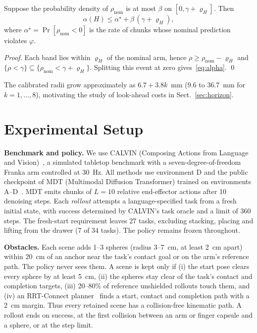 \documentclass[runningheads]{llncs}
\begin{document}
\begin{proposition}\label{prop:conservatism}
Suppose the probability density of $\rho_{\mathrm{nom}}$ is at most
$\beta$ on $[0,\gamma+\varrho_H]$. Then
\begin{equation}
\alpha(H) \le \alpha^\star + \beta\,(\gamma + \varrho_H),
\label{eq:alpha}
\end{equation}
where $\alpha^\star = \Pr[\rho_{\mathrm{nom}} < 0]$ is the rate of chunks
whose nominal prediction violates $\varphi$.
\end{proposition}
\begin{proof}
Each band lies within $\varrho_H$ of the nominal arm, hence
$\rho \ge \rho_{\mathrm{nom}} - \varrho_H$ and
$\{\rho < \gamma\} \subseteq \{\rho_{\mathrm{nom}} < \gamma + \varrho_H\}$.
Splitting this event at zero gives~\eqref{eq:alpha}. \qed
\end{proof}

The calibrated radii grow approximately as $6.7+3.8k$~mm (9.6 to 36.7~mm
for $k=1,\dots,8$), motivating the study of look-ahead costs in
Sect.~\ref{sec:horizon}.

\section{Experimental Setup}\label{sec:setup}

\textbf{Benchmark and policy.} We use CALVIN (Composing Actions from Language
and Vision)~\cite{mees2022calvin}, a simulated tabletop benchmark with a
seven-degree-of-freedom Franka arm controlled at 30~Hz.
All methods use environment D and the public checkpoint of MDT
(Multimodal Diffusion Transformer) trained on environments A--D~\cite{reuss2024mdt}. MDT
emits chunks of $L = 10$ relative end-effector actions after 10 denoising
steps. Each \emph{rollout} attempts a language-specified task from a fresh
initial state, with success determined by CALVIN's task oracle and a limit
of 360 steps. The fresh-start requirement leaves 27 tasks,
excluding stacking, placing and lifting from the drawer (7 of 34 tasks).
The policy remains frozen throughout.

\textbf{Obstacles.} Each scene adds 1--3 spheres (radius 3--7~cm, at least
2~cm apart) within 20~cm of an anchor near the task's contact goal or on the
arm's reference path. The policy never sees them. A scene
is kept only if (i) the start pose clears every sphere by at least 5~cm,
(ii) the spheres stay clear of the task's contact and completion targets,
(iii) 20--80\% of reference unshielded rollouts touch them, and (iv) an
RRT-Connect planner~\cite{kuffner2000rrt} finds a start, contact and
completion path with a 2~cm margin. Thus every retained scene has a
collision-free kinematic path. A rollout ends on success, at the first
collision between an arm or finger capsule and a sphere, or at the step limit.
\end{document}
